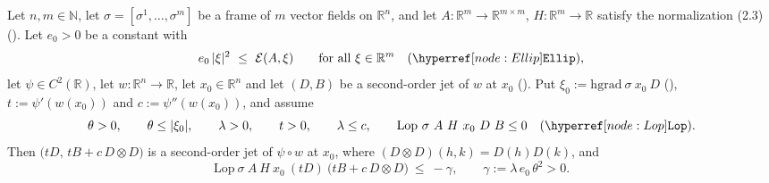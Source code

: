 \begin{corollary}[Corollary~3.2]
Let $n,m\in\mathbb N$, let $\sigma=[\sigma^1,\ldots,\sigma^m]$ be a frame of $m$ vector
fields on $\mathbb R^{n}$, and let $A:\mathbb R^{m}\to\mathbb R^{m\times m}$,
$H:\mathbb R^{m}\to\mathbb R$ satisfy the normalization (2.3)
(). Let $e_0>0$ be a constant with
\[
 e_0\,|\xi|^{2}\ \le\ \mathcal E(A,\xi)\qquad\text{for all }\xi\in\mathbb R^{m}
 \quad(\noderef{Ellip}),
\]
let $\psi\in C^{2}(\mathbb R)$, let $w:\mathbb R^{n}\to\mathbb R$, let $x_0\in\mathbb R^{n}$
and let $(D,B)$ be a second-order jet of $w$ at $x_0$ (). Put
$\xi_0:=\mathrm{hgrad}\ \sigma\ x_0\ D$ (), $t:=\psi'(w(x_0))$ and
$c:=\psi''(w(x_0))$, and assume
\[
 \theta>0,\qquad \theta\le|\xi_0|,\qquad \lambda>0,\qquad t>0,\qquad \lambda\le c,\qquad
 \mathrm{Lop}\ \sigma\ A\ H\ x_0\ D\ B\le0\quad(\noderef{Lop}).
\]
Then $\big(tD,\,tB+c\,D\otimes D\big)$ is a second-order jet of $\psi\circ w$ at $x_0$,
where $(D\otimes D)(h,k)=D(h)D(k)$, and
\[
 \mathrm{Lop}\ \sigma\ A\ H\ x_0\ (tD)\ \big(tB+c\,D\otimes D\big)\ \le\ -\gamma,
 \qquad \gamma:=\lambda\,e_0\,\theta^{2}>0 .
\]
\end{corollary}
